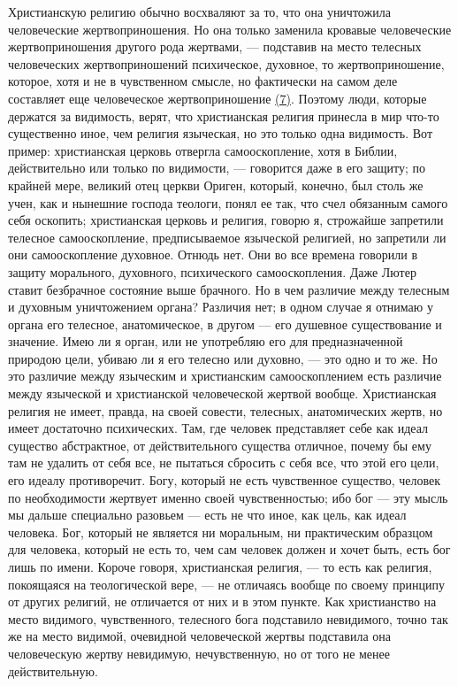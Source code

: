 \documentclass[12pt]{article}
\begin{document}
Христианскую религию обычно восхваляют за то, что она уничтожила человеческие жертвоприношения. Но она только заменила кровавые человеческие жертвоприношения другого рода жертвами, --- подставив на место телесных человеческих жертвоприношений психическое, духовное, то жертвоприношение, которое, хотя и не в чувственном смысле, но фактически на самом деле составляет еще человеческое жертвоприношение \hyperlink{7}{(7)}\hypertarget{b7}{}. Поэтому люди, которые держатся за видимость, верят, что христианская религия принесла в мир что-то существенно иное, чем религия языческая, но это только одна видимость. Вот пример: христианская церковь отвергла самооскопление, хотя в Библии, действительно или только по видимости, --- говорится даже в его защиту; по крайней мере, великий отец церкви Ориген, который, конечно, был столь же учен, как и нынешние господа теологи, понял ее так, что счел обязанным самого себя оскопить; христианская церковь и религия, говорю я, строжайше запретили телесное самооскопление, предписываемое языческой религией, но запретили ли они самооскопление духовное. Отнюдь нет. Они во все времена говорили в защиту морального, духовного, психического самооскопления. Даже Лютер ставит безбрачное состояние выше брачного. Но в чем различие между телесным и духовным уничтожением органа? Различия нет; в одном случае я отнимаю у органа его телесное, анатомическое, в другом --- его душевное существование и значение. Имею ли я орган, или не употребляю его для предназначенной природою цели, убиваю ли я его телесно или духовно, --- это одно и то же. Но это различие между языческим и христианским самооскоплением есть различие между языческой и христианской человеческой жертвой вообще. Христианская религия не имеет, правда, на своей совести, телесных, анатомических жертв, но имеет достаточно психических. Там, где человек представляет себе как идеал существо абстрактное, от действительного существа отличное, почему бы ему там не удалить от себя все, не пытаться сбросить с себя все, что этой его цели, его идеалу противоречит. Богу, который не есть чувственное существо, человек по необходимости жертвует именно своей чувственностью; ибо бог --- эту мысль мы дальше специально разовьем --- есть не что иное, как цель, как идеал человека. Бог, который не является ни моральным, ни практическим образцом для человека, который не есть то, чем сам человек должен и хочет быть, есть бог лишь по имени. Короче говоря, христианская религия, --- то есть как религия, покоящаяся на теологической вере, --- не отличаясь вообще по своему принципу от других религий, не отличается от них и в этом пункте. Как христианство на место видимого, чувственного, телесного бога подставило невидимого, точно так же на место видимой, очевидной человеческой жертвы подставила она человеческую жертву невидимую, нечувственную, но от того не менее действительную. 
\end{document}
